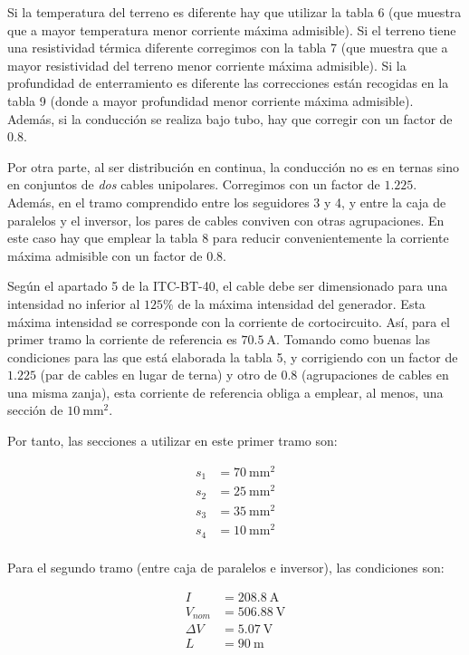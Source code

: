 Si la temperatura del terreno es diferente hay que utilizar la tabla 6
(que muestra que a mayor temperatura menor corriente máxima
admisible). Si el terreno tiene una resistividad térmica diferente
corregimos con la tabla 7 (que muestra que a mayor resistividad del
terreno menor corriente máxima admisible). Si la profundidad de
enterramiento es diferente las correcciones están recogidas en la
tabla 9 (donde a mayor profundidad menor corriente máxima
admisible). Además, si la conducción se realiza bajo tubo, hay que
corregir con un factor de $0.8$.

Por otra parte, al ser distribución en continua, la conducción no es
en ternas sino en conjuntos de \emph{dos} cables
unipolares. Corregimos con un factor de $1.225$. Además, en el tramo
comprendido entre los seguidores 3 y 4, y entre la caja de paralelos y
el inversor, los pares de cables conviven con otras agrupaciones. En
este caso hay que emplear la tabla 8 para reducir convenientemente la
corriente máxima admisible con un factor de 0.8.

Según el apartado 5 de la ITC-BT-40, el cable debe ser dimensionado
para una intensidad no inferior al $125\%$ de la máxima intensidad del
generador. Esta máxima intensidad se corresponde con la corriente de
cortocircuito. Así, para el primer tramo la corriente de referencia es
$\SI{70.5}{\ampere}$.  Tomando como buenas las
condiciones para las que está elaborada la tabla 5, y corrigiendo con
un factor de $1.225$ (par de cables en lugar de terna) y otro de $0.8$
(agrupaciones de cables en una misma zanja), esta corriente de
referencia obliga a emplear, al menos, una sección de
$\SI{10}{\milli\meter\squared}$. 

Por tanto, las secciones a utilizar en este primer tramo son:

\begin{align*}
  s_1 & = \SI{70}{\milli\meter\squared}\\
  s_2 & = \SI{25}{\milli\meter\squared}\\
  s_3 & = \SI{35}{\milli\meter\squared}\\
  s_4 & = \SI{10}{\milli\meter\squared}\\
\end{align*}

Para el segundo tramo (entre caja de paralelos e inversor), las
condiciones son:

\begin{align*}
  I & =\SI{208.8}{\ampere}\\
  V_{nom} & = \SI{506.88}{\volt}\\
  \Delta V & = \SI{5.07}{\volt}\\
  L & = \SI{90}{\meter}
\end{align*}

